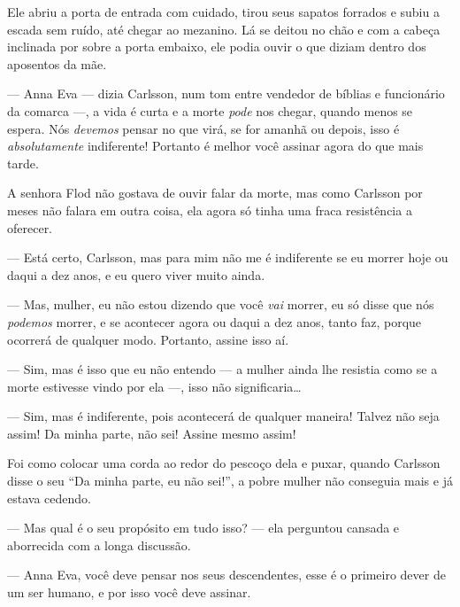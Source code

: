 Ele abriu a porta de entrada com cuidado, tirou seus sapatos forrados e subiu a
escada sem ruído, até chegar ao mezanino. Lá se deitou no chão e com a
cabeça inclinada por sobre a porta embaixo, ele podia ouvir o que diziam dentro
dos aposentos da mãe.

--- Anna Eva --- dizia Carlsson, num tom entre vendedor de bíblias e funcionário
da comarca ---, a vida é curta e a morte \textit{pode} nos chegar, quando menos se espera. 
Nós \textit{devemos} pensar no que virá, se for amanhã ou
depois, isso é \textit{absolutamente} indiferente! Portanto é melhor você assinar
agora do que mais tarde.

A senhora Flod não gostava de ouvir falar da morte, mas como Carlsson por meses
não falara em outra coisa, ela agora só tinha uma fraca resistência a oferecer.

--- Está certo, Carlsson, mas para mim não me é indiferente se eu morrer
hoje ou daqui a dez anos, e eu quero viver muito ainda.

--- Mas, mulher, eu não estou dizendo que você \textit{vai} morrer, eu só disse
que nós \textit{podemos} morrer, e se acontecer agora ou daqui a dez anos, tanto
faz, porque ocorrerá de qualquer modo. Portanto, assine isso aí.

--- Sim, mas é isso que eu não entendo --- a mulher ainda lhe resistia como se a
morte estivesse vindo por ela ---, isso não significaria\ldots{}

--- Sim, mas é indiferente, pois acontecerá de qualquer maneira! Talvez não seja
assim! Da minha parte, não sei! Assine mesmo assim!

Foi como colocar uma corda ao redor do pescoço dela e puxar, quando Carlsson
disse o seu ``Da minha parte, eu não sei!'', a pobre mulher não conseguia mais e
já estava cedendo.

--- Mas qual é o seu propósito em tudo isso? --- ela perguntou cansada e
aborrecida com a longa discussão.

--- Anna Eva, você deve pensar nos seus descendentes, esse é o primeiro dever de
um ser humano, e por isso você deve assinar.

